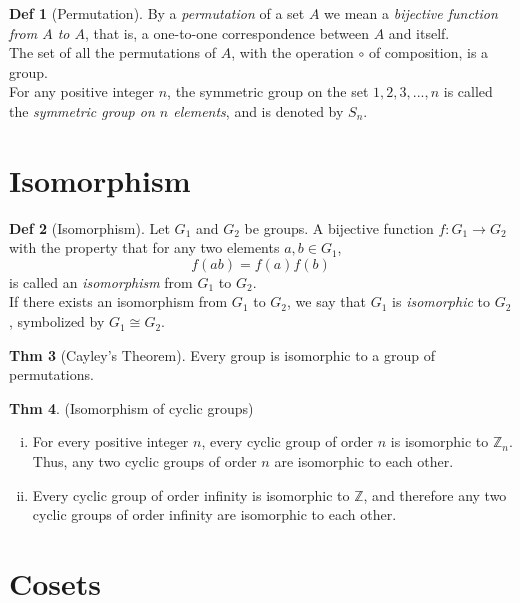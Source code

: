 \documentclass{article}
\theoremstyle{definition}
\newtheorem{definition}{Def}[section]
\newtheorem{theorem}[definition]{Thm}
\begin{document}
\begin{definition}[Permutation]
    By a \emph{permutation} of a set $A$ we mean a \emph{bijective function from $A$ to $A$}, that is, a one-to-one correspondence between $A$ and itself.
    \\
    The set of all the permutations of $A$, with the operation $\circ$ of composition, is a group.
    \\
    For any positive integer $n$, the symmetric group on the set ${1,2, 3,..., n}$ is called the \emph{symmetric group on $n$ elements}, and is denoted by $S_n$.
\end{definition}


\section{Isomorphism}

\begin{definition}[Isomorphism]
    Let $G_1$ and $G_2$ be groups. A bijective function $f: G_1 \rightarrow G_2$ with the property that for any two elements $a, b \in G_1$,
    $$f(ab) = f(a)f(b)$$
    is called an \emph{isomorphism} from $G_1$ to $G_2$.
    \\
    If there exists an isomorphism from $G_1$ to $G_2$, we say that $G_1$ is \emph{isomorphic} to $G_2$, symbolized by $G_1 \cong G_2$.
\end{definition}


\begin{theorem}[Cayley's Theorem]
    Every group is isomorphic to a group of permutations.
\end{theorem}

\begin{theorem}
    (Isomorphism of cyclic groups)
    \begin{enumerate}[i.]
	\item For every positive integer $n$, every cyclic group of order $n$ is isomorphic to $\mathbb{Z}_n$. Thus, any two cyclic groups of order $n$ are isomorphic to each other.
	\item Every cyclic group of order infinity is isomorphic to $\mathbb{Z}$, and therefore any two cyclic groups of order infinity are isomorphic to each other.
    \end{enumerate}
\end{theorem}

\section{Cosets}
\end{document}
